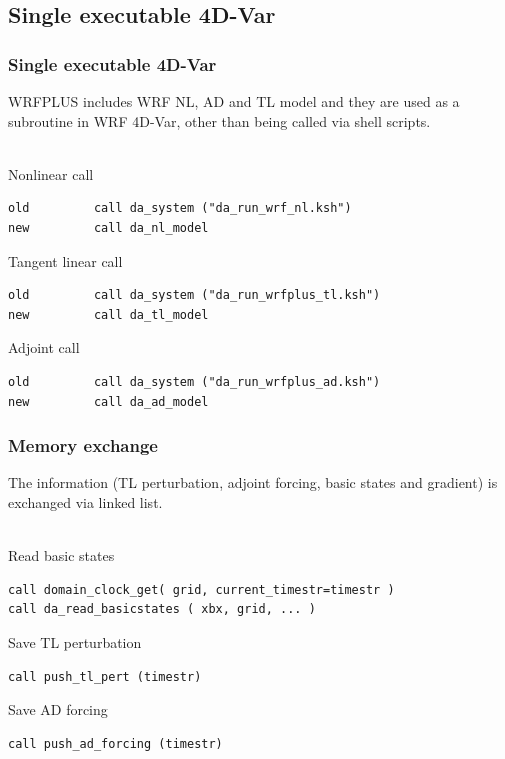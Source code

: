 \documentclass{beamer}
\begin{document}
\subsection{Single executable 4D-Var}
\begin{frame}[fragile]
\frametitle{Single executable 4D-Var}
WRFPLUS includes WRF NL, AD and TL model and they are used as a subroutine in WRF 4D-Var, other than being called via shell scripts.
~\\
~\\
\begin{beamerboxesrounded}[ lower=postit,shadow=true]{Nonlinear call}
\begin{verbatim}
old         call da_system ("da_run_wrf_nl.ksh")
new         call da_nl_model
\end{verbatim}
\end{beamerboxesrounded}
\begin{beamerboxesrounded}[ lower=postit,shadow=true]{Tangent linear call}
\begin{verbatim}
old         call da_system ("da_run_wrfplus_tl.ksh")
new         call da_tl_model
\end{verbatim}
\end{beamerboxesrounded}
\begin{beamerboxesrounded}[ lower=postit,shadow=true]{Adjoint call}
\begin{verbatim}
old         call da_system ("da_run_wrfplus_ad.ksh")
new         call da_ad_model
\end{verbatim}
\end{beamerboxesrounded}
\end{frame}

\begin{frame}[fragile]
\frametitle{Memory exchange}
The information (TL perturbation, adjoint forcing, basic states and gradient) is exchanged via linked list.
~\\
~\\
\begin{beamerboxesrounded}[ lower=postit,shadow=true]{Read basic states}
\begin{verbatim}
call domain_clock_get( grid, current_timestr=timestr )
call da_read_basicstates ( xbx, grid, ... )
\end{verbatim}
\end{beamerboxesrounded}
\begin{beamerboxesrounded}[ lower=postit,shadow=true]{Save TL perturbation}
\begin{verbatim}
call push_tl_pert (timestr)
\end{verbatim}
\end{beamerboxesrounded}
\begin{beamerboxesrounded}[ lower=postit,shadow=true]{Save AD forcing}
\begin{verbatim}
call push_ad_forcing (timestr)
\end{verbatim}
\end{beamerboxesrounded}
\end{frame}
\end{document}
